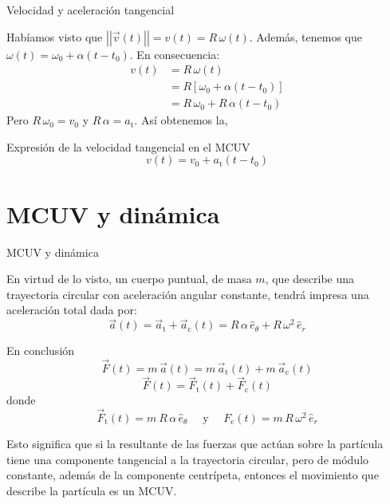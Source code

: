 \documentclass[11pt,handout,aspectratio=1610]{beamer}
\newcommand{\norm}[1]{\left\vert\left\vert #1 \right\vert\right\vert}
\begin{document}
\begin{frame}{Velocidad y aceleración tangencial}

    Habíamos visto que $\norm{\vec{v} (t)} = v (t) = R \, \omega (t)$. \pause Además, tenemos que $\omega (t) = \omega_0 + \alpha \left(t-t_0\right)$. \pause En consecuencia: 
    \begin{equation*}
        \begin{split}
            v(t) &= R \, \omega(t) \\ 
                 &= R \left[\omega_0 + \alpha \left(t-t_0\right)\right] \\
                 &= R \, \omega_0 + R \, \alpha \left(t-t_0\right)
        \end{split}
    \end{equation*} \pause Pero $R \, \omega_0 = v_0$ y $R \, \alpha = a_{\text{t}}$. \pause Así obtenemos la,

    \begin{block}{Expresión de la velocidad tangencial en el MCUV}
        $$v (t) = v_0 + a_{\text{t}} \left(t-t_0\right)$$
    \end{block}

\end{frame}

\section{MCUV y dinámica}

\begin{frame}{MCUV y dinámica}

    En virtud de lo visto, un cuerpo puntual, de masa $m$, que describe una trayectoria circular con aceleración angular constante, tendrá impresa una aceleración total dada por: $$\vec{a} (t) = \vec{a}_{\text{t}} + \vec{a}_{\text{c}} (t) =  R \, \alpha \, \hat{e}_\theta + R \, \omega^2 \, \hat{e}_r$$

    \begin{block}{En conclusión}
        \vspace{-0.5cm}
        $$\vec{F} (t) = m \, \vec{a} (t) = m \, \vec{a}_{\text{t}} (t) + m \, \vec{a}_{\text{c}} (t)$$ \pause
        \vspace{-0.5cm}
        $$\vec{F} (t) = \vec{F}_{\text{t}} (t) + \vec{F}_{\text{c}} (t)$$ donde $$ \vec{F}_{\text{t}} (t) = m \ R \, \alpha \, \hat{e}_\theta \quad \text{ y } \quad F_{\text{c}} (t) = m \, R \, \omega^2 \, \hat{e}_r $$
    \end{block}

    Esto significa que si la resultante de las fuerzas que actúan sobre la partícula tiene una componente tangencial a la trayectoria circular, pero de módulo constante, además de la componente centrípeta, entonces el movimiento que describe la partícula es un MCUV.

\end{frame}
\end{document}
